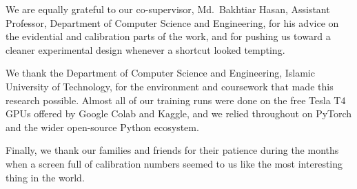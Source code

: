 \documentclass[12pt,a4paper,oneside]{report}
\begin{document}
We are equally grateful to our co-supervisor, Md.\ Bakhtiar Hasan, Assistant Professor, Department of
Computer Science and Engineering, for his advice on the evidential and calibration parts of the work,
and for pushing us toward a cleaner experimental design whenever a shortcut looked tempting.

We thank the Department of Computer Science and Engineering, Islamic University of Technology, for the
environment and coursework that made this research possible. Almost all of our training runs were
done on the free Tesla T4 GPUs offered by Google Colab and Kaggle, and we relied throughout on PyTorch
and the wider open-source Python ecosystem.

Finally, we thank our families and friends for their patience during the months when a screen full of
calibration numbers seemed to us like the most interesting thing in the world.

\end{document}

